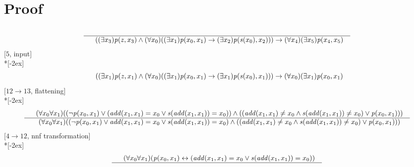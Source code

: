 \documentclass[fleqn]{article}
\newenvironment{VampireProof}{%
   \section{Proof}}{}
\newenvironment{VampireInference}{%
   \begin{array}{c}}{\end{array}}
\newenvironment{VampirePremise}%
   {\begin{array}{l}}%
   {\end{array}}
\newenvironment{VampireConclusion}%
   {\begin{array}{l}}%
   {\end{array}}
\newcommand{\VConclusionSeparator}{\\ \hline}
\newcommand{\Vor}{\vee}
\newcommand{\Vand}{\wedge}
\newcommand{\Vimp}{\rightarrow}
\newcommand{\Viff}{\leftrightarrow}
\begin{document}
\begin{VampireProof}
\[\begin{VampireInference}
\VConclusionSeparator
\begin{VampireConclusion}
~~((\exists x_{3} )\mathit{p} (\mathit{z},x_{3}) \Vand (\forall x_{0} )((\exists x_{1} )\mathit{p} (x_{0},x_{1}) \Vimp (\exists x_{2} )\mathit{p} (\mathit{s} (x_{0}),x_{2}))) \Vimp (\forall x_{4} )(\exists x_{5} )\mathit{p} (x_{4},x_{5})
\end{VampireConclusion}
\end{VampireInference}
\]
[$5$, input]\\*[-2ex]
\[\begin{VampireInference}
\begin{VampireConclusion}
~~((\exists x_{1} )\mathit{p} (\mathit{z},x_{1}) \Vand (\forall x_{0} )((\exists x_{1} )\mathit{p} (x_{0},x_{1}) \Vimp (\exists x_{1} )\mathit{p} (\mathit{s} (x_{0}),x_{1}))) \Vimp (\forall x_{0} )(\exists x_{1} )\mathit{p} (x_{0},x_{1})
\end{VampireConclusion}
\end{VampireInference}
\]
[$12\rightarrow 13$, flattening]\\*[-2ex]
\[\begin{VampireInference}
\begin{VampirePremise}%
~~(\forall x_{0} \forall x_{1} )((\neg \mathit{p} (x_{0},x_{1}) \Vor (\mathit{add} (x_{1},x_{1}) = x_{0} \Vor \mathit{s} (\mathit{add} (x_{1},x_{1})) = x_{0})) \Vand ((\mathit{add} (x_{1},x_{1}) \neq x_{0} \Vand \mathit{s} (\mathit{add} (x_{1},x_{1})) \neq x_{0}) \Vor \mathit{p} (x_{0},x_{1})))
\end{VampirePremise}
\VConclusionSeparator
\begin{VampireConclusion}
~~(\forall x_{0} \forall x_{1} )((\neg \mathit{p} (x_{0},x_{1}) \Vor \mathit{add} (x_{1},x_{1}) = x_{0} \Vor \mathit{s} (\mathit{add} (x_{1},x_{1})) = x_{0}) \Vand ((\mathit{add} (x_{1},x_{1}) \neq x_{0} \Vand \mathit{s} (\mathit{add} (x_{1},x_{1})) \neq x_{0}) \Vor \mathit{p} (x_{0},x_{1})))
\end{VampireConclusion}
\end{VampireInference}
\]
[$4\rightarrow 12$, nnf transformation]\\*[-2ex]
\[\begin{VampireInference}
\begin{VampirePremise}%
~~(\forall x_{0} \forall x_{1} )(\mathit{p} (x_{0},x_{1}) \Viff (\mathit{add} (x_{1},x_{1}) = x_{0} \Vor \mathit{s} (\mathit{add} (x_{1},x_{1})) = x_{0}))
\end{VampirePremise}
\VConclusionSeparator
\begin{VampireConclusion}

\end{VampireConclusion}
\end{VampireInference}\]
\end{VampireProof}
\end{document}
